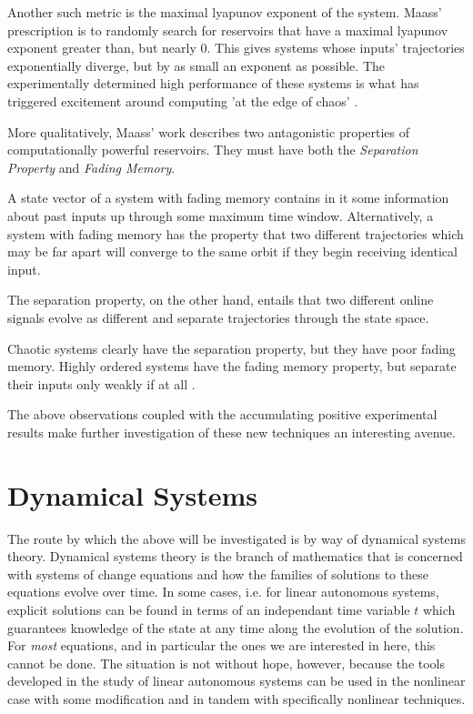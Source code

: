 \documentclass{elsart1p}
\begin{document}
Another such metric is the maximal lyapunov exponent of the system.  
Maass' prescription
is to randomly search for reservoirs that have a maximal lyapunov exponent
greater than, but nearly 0.  This gives systems whose inputs' trajectories
exponentially diverge, but by as small an exponent as possible.  The 
experimentally determined high performance of these systems is what has
triggered excitement around computing 'at the edge of chaos' \cite{verstraeten}.

More qualitatively, Maass' work describes two antagonistic properties of 
computationally powerful reservoirs.  They must have both the \textit{
    Separation Property} and \textit{Fading Memory}.

    A state vector of a system with fading memory contains in it some
    information about past inputs up through some maximum time window.
    Alternatively, a system with fading memory has the property that 
    two different trajectories which may be far apart will converge to
    the same orbit if they begin receiving identical input.

    The separation property, on the other hand, entails that two different
    online signals evolve as different and separate trajectories through
    the state space.

    Chaotic systems clearly have the separation property, but they have poor
    fading memory.  Highly ordered systems have the fading memory property, 
    but separate their inputs only weakly if at all \cite{maass_what_makes}.

    The above observations coupled with the accumulating positive 
    experimental results make further investigation of these new 
    techniques an interesting avenue.


\section{Dynamical Systems}
The route by which the above will be investigated is by way of dynamical systems theory.
Dynamical systems theory is the branch of mathematics that is 
concerned with systems of change equations and how the families of
solutions to these equations evolve over time.
In some cases, i.e. for linear
autonomous systems, explicit solutions can be found in terms of an
independant time variable $t$ which guarantees knowledge of the state at
any time along the evolution of the solution.  For \textit{most} equations, and
in particular the ones we are interested in here, this cannot be done.
The situation is not without hope, however, because the tools developed 
in the study of linear autonomous systems can be used in the nonlinear 
case with some modification and in tandem with specifically nonlinear 
techniques.
\end{document}

